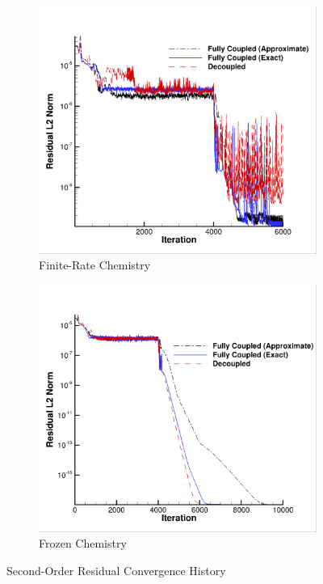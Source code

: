 \begin{figure}[h]
  \centering
	\begin{subfigure}[b]{0.45\textwidth}
    \includegraphics[width=\textwidth]{figures/flow-efficiency/dc-gfc-res-chem.png}
    \caption{Finite-Rate Chemistry}
    \label{fig:srp-dc-gfc-res-frozen}
  \end{subfigure}
	\begin{subfigure}[b]{0.45\textwidth}
    \includegraphics[width=\textwidth]{figures/flow-efficiency/dc-gfc-res-frozen.png}
    \caption{Frozen Chemistry}
    \label{fig:srp-dc-gfc-res-chem}
  \end{subfigure}
  \caption{Second-Order Residual Convergence History}
  \label{fig:srp-dc-gfc-res}
\end{figure}
